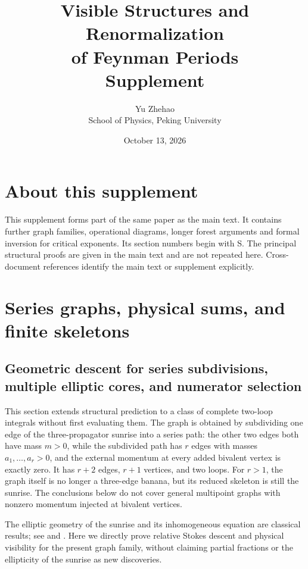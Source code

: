 \documentclass[11pt,a4paper,oneside]{article}
\title{Visible Structures and Renormalization\\of Feynman Periods\\[6pt]\large Supplement}
\author{Yu Zhehao\\[4pt]\small School of Physics, Peking University}
\date{October 13, 2026}
\theoremstyle{plain}
\theoremstyle{definition}
\theoremstyle{remark}
\newcommand{\Q}{\mathbb Q}
\newcommand{\im}{\operatorname{im}}
\newcommand{\dR}{\mathrm{dR}}
\numberwithin{equation}{section}
\begin{document}
\maketitle\tableofcontents
\section*{About this supplement}
This supplement forms part of the same paper as the main text. It contains further graph families, operational diagrams, longer forest arguments and formal inversion for critical exponents. Its section numbers begin with S.
The principal structural proofs are given in the main text and are not repeated here. Cross-document references identify the main text or supplement explicitly.


\section{Series graphs, physical sums, and finite skeletons}\label{supp:unified}

\begingroup
\providecommand{\Q}{\mathbb Q}\providecommand{\cC}{\mathcal C}
\providecommand{\cS}{\mathcal S}\providecommand{\dR}{\mathrm{dR}}
\providecommand{\rk}{\operatorname{rk}}\providecommand{\im}{\operatorname{im}}
\subsection{Geometric descent for series subdivisions, multiple elliptic cores, and numerator selection}
\label{unified:sec:serieselliptic}
This section extends structural prediction to a class of complete two-loop integrals without first evaluating them.
The graph is obtained by subdividing one edge of the three-propagator sunrise into a series path:
the other two edges both have mass $m>0$, while the subdivided path has $r$ edges with masses
$a_1,\ldots,a_r>0$, and the external momentum at every added bivalent vertex is exactly zero.
It has $r+2$ edges, $r+1$ vertices, and two loops.
For $r>1$, the graph itself is no longer a three-edge banana, but its reduced skeleton is still the sunrise.
The conclusions below do not cover general multipoint graphs with nonzero momentum injected at bivalent vertices.

The elliptic geometry of the sunrise and its inhomogeneous equation are classical results; see
\cite[\S4--5]{abwsun} and \cite[\S3--4]{bkvsunset}.
Here we directly prove relative Stokes descent and physical visibility for the present graph family,
without claiming partial fractions or the ellipticity of the sunrise as new discoveries.
\end{document}
